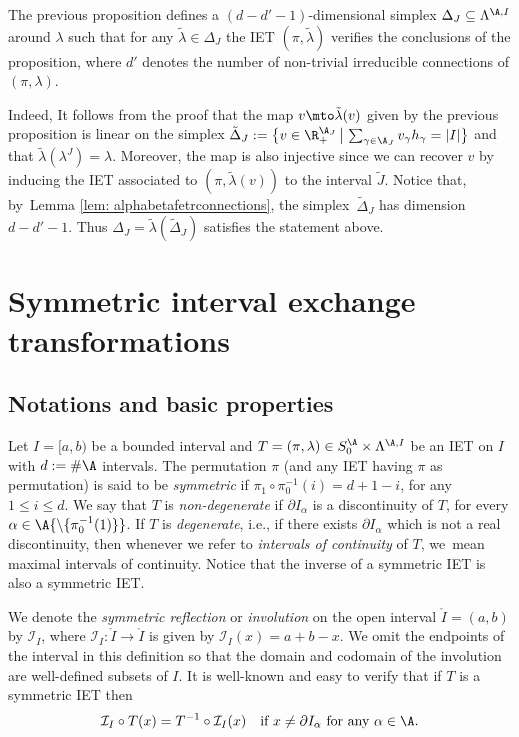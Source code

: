 \begin{remark}
\label{rmk:simplex}
The previous proposition defines a $(d - d' - 1)$-dimensional simplex $\Delta_J \subseteq \Lambda^{\A, I}$ around $\lambda$ such that for any $\tilde \lambda \in \Delta_J$ the IET $(\pi, \tilde\lambda)$ verifies the conclusions of the proposition, where $d'$ denotes the number of non-trivial {irreducible} connections of $(\pi, \lambda)$.

Indeed, It follows from the proof that the map $v \mto \tilde{\lambda}(v)$ given by the previous proposition is linear on the simplex $\tilde \Delta_J:= \big\{v \in \R^{\A_J}_+ \, \big| \, \sum_{\gamma \in \A_J} v_\gamma h_\gamma = |I| \big\} $ and that $\tilde\lambda(\lambda^J) = \lambda$. Moreover, the map is also injective since we can recover $v$ by inducing the IET associated to $(\pi, \tilde\lambda(v))$ to the interval $\tilde J$. Notice that, by~Lemma \ref{lem: alphabetafetrconnections}, the simplex~$\tilde \Delta_J$ has dimension $d - d' -1$. Thus $\Delta_J = \tilde\lambda(\tilde \Delta_J)$ satisfies the statement above.
\end{remark}

\section{Symmetric interval exchange transformations}

\subsection{Notations and basic properties}
Let $I = [a, b)$ be a bounded interval and $T=(\pi, \lambda) \in S_0^\A \times \Lambda^{\A, I}$ be an IET on $I$ with $d := \#\A$ intervals. The permutation $\pi$ (and any IET having $\pi$ as permutation) is said to be \textit{symmetric} if $\pi_{1}\circ \pi^{-1}_{0}(i)=d+1-i$, for any $1 \leq i \leq d$. We say that $T$ is \emph{non-degenerate} if $\partial I_{\alpha}$ is a discontinuity of $T$, for every $\alpha\in \A {\setminus \{\pi_0^{-1}(1)\}}$. If $T$ is \emph{degenerate}, i.e., if there exists $\partial I_{\alpha}$ which is not a real discontinuity, then whenever we refer to \emph{intervals of continuity} of $T$, we~mean maximal intervals of continuity. Notice that the inverse of a symmetric IET is also a symmetric IET.

We denote the \emph{symmetric reflection} or \emph{involution} on the open interval $\mathring{I} = (a, b)$ by $\mathcal{I}_I$, where $\mathcal{I}_I: \mathring{I}\to \mathring{I}$ is given by $\mathcal{I}_I(x)= a + b - x$. We omit the endpoints of the interval in this definition so that the domain and codomain of the involution are well-defined subsets of $I$.
It is well-known and easy to verify that if $T$ is a symmetric IET then
\begin{equation}\label{eq: standardconjugacy}
\mathcal{I}_I\circ T(x)=T^{-1}\circ\mathcal{I}_I(x) \quad \text{if } x \neq \partial I_{\alpha} \text{ for any } \alpha \in \A.
\end{equation}

